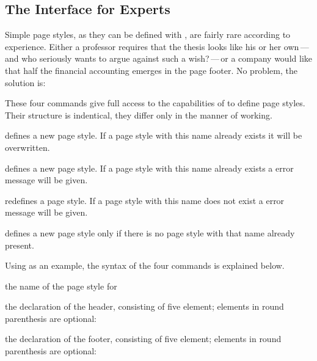 \subsection{The Interface for Experts}\label{sec:scrpage-en.UI.expert}
Simple page styles, as they can be defined with ,
are fairly rare according to experience.  Either a professor requires
that the thesis looks like his or her own\,---\,and who seriously wants
to argue against such a wish?\,---\,or a company would like that half the
financial accounting emerges in the page footer.  No problem, the
solution is:
%
\begin{Declaration}
\end{Declaration}%
These four commands give full access to the capabilities of
 to define page styles.  Their structure is
indentical, they differ only in the manner of working.
\begin{labeling}[\ --]{}
\item[\Macro{defpagestyle}] defines a new page style.
If a page style with this name already exists it will be overwritten.
\item[\Macro{newpagestyle}] defines a new page style.
If a page style with this name already exists a error message will be given.
\item[\Macro{renewpagestyle}] redefines a page style.
If a page style with this name does not exist a error message will be given.
\item[\Macro{providepagestyle}] defines a new page style only if there is no page style with that name already present.
\end{labeling}

Using  as an example, the syntax of the four
commands is explained below.
\begin{labeling}[~--]{}
\item[\PName{name}] the name of the page style for
\item[\PName{header definition}] the declaration of the header, consisting
  of five element; elements in round parenthesis are optional:\hfill\\
  \hspace*{1em}%
\item[\PName{footer definition}]  the declaration of the footer, consisting
  of five element; elements in round parenthesis are optional:\hfill\\  
  \hspace*{1em}%
\end{labeling}

